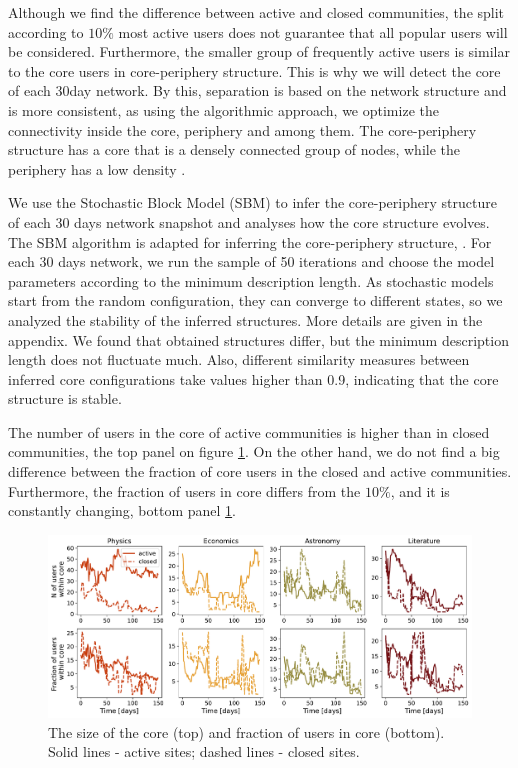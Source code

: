 Although we find the difference between active and closed communities, the split according to $10\%$  most active users does not guarantee that all popular users will be considered. Furthermore, the smaller group of frequently active users is similar to the core users in core-periphery structure. This is why we will detect the core of each 30day network. By this, separation is based on the network structure and is more consistent, as using the algorithmic approach, we optimize the connectivity inside the core, periphery and among them. The core-periphery structure has a core that is a densely connected group of nodes, while the periphery has a low density \cite{fortunato2010community, gallagher2020clarified}. 

We use the Stochastic Block Model (SBM) to infer the core-periphery structure of each 30 days network snapshot and analyses how the core structure evolves. The  SBM algorithm is adapted for inferring the core-periphery structure, \cite{gallagher2020clarified}. For each 30 days network, we run the sample of 50 iterations and choose the model parameters according to the minimum description length. As stochastic models start from the random configuration, they can converge to different states, so we analyzed the stability of the inferred structures. More details are given in the appendix. We found that obtained structures differ, but the minimum description length does not fluctuate much. Also, different similarity measures between inferred core configurations take values higher than 0.9, indicating that the core structure is stable. 

The number of users in the core of active communities is higher than in closed communities, the top panel on figure \ref{fig:core_size}. On the other hand, we do not find a big difference between the fraction of core users in the closed and active communities. Furthermore, the fraction of users in core differs from the $10\%$, and it is constantly changing, bottom panel \ref{fig:core_size}. 

\begin{figure}[h!]
	\centering
	\includegraphics[width=\linewidth]{figures/stackexchange/core_users.pdf}
	\caption[The size of the core]{The size of the core (top) and fraction of users in core (bottom). Solid lines - active sites; dashed lines - closed sites.}
	\label{fig:core_size}
\end{figure}

